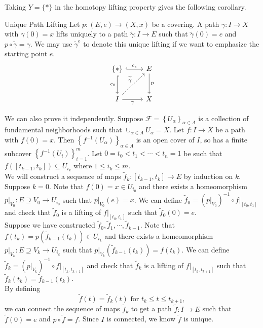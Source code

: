 \documentclass{report}
\begin{document}
Taking $Y=\{*\}$ in the homotopy lifting property gives the following corollary.

\begin{corollary}{Unique Path Lifting}{}
	Let $p: (E,e) \to (X,x)$ be a covering. A path $\gamma: I \to X$ with $\gamma(0)=x$ lifts uniquely to a path $\widetilde{\gamma}: I \to E$ such that $\widetilde{\gamma}(0)=e$ and $p \circ \widetilde{\gamma}=\gamma$. We may use $\widetilde{\gamma}^e$ to denote this unique lifting if we want to emphasize the starting point $e$.
	\[
		\begin{tikzcd}[ampersand replacement=\&]
			\{*\} \arrow[r, "c_e", hook] \arrow[d, "c_0"', hook]                      \& E \arrow[d, "p"] \\ [+8pt]
			I \arrow[r, "\gamma"'] \arrow[ru, "\widetilde{\gamma}", dashed] \& X
		\end{tikzcd}
	\]
\end{corollary}

\begin{prf}
	We can also prove it independently. Suppose $\mathcal{F}=\left\{U_\alpha\right\}_{\alpha\in A}$ is a collection of fundamental neighborhoods such that $\cup_{\alpha\in A}U_\alpha=X$. Let $f:I\to X$ be a path with $f(0)=x$. Then $\left\{f^{-1}(U_\alpha)\right\}_{\alpha\in A}$ is an open cover of $I$, so has a finite subcover $\left\{f^{-1}(U_{i})\right\}_{i=1}^m$. Let $0=t_0<t_1<\cdots<t_n=1$ be such that $f([t_{k-1},t_k])\subseteq U_{i_k}$ where $1\le i_k \le m$. \\
	We will construct a sequence of maps $\widetilde{f}_k:[t_{k-1},t_k]\to E$ by induction on $k$. Suppose $k=0$. Note that $f(0)=x\in U_{i_0}$ and there exists a homeomorphism $\left.p\right|_{V_0}: E\supseteq V_0\to U_{i_0}$ such that $\left.p\right|_{V_0}(e)=x$. We can define $\widetilde{f}_0=\left(\left.p\right|_{V_0}\right)^{-1}\circ f|_{[t_0,t_1]}$ and check that $\widetilde{f}_0$ is a lifting of $f|_{[t_0,t_1]}$ such that $\widetilde{f}_0(0)=e$. \\
	Suppose we have constructed $\widetilde{f}_0,\widetilde{f}_1,\cdots,\widetilde{f}_{k-1}$. Note that $f(t_{k})=p\left(\widetilde{f}_{k-1}(t_k)\right)\in U_{i_k}$ and there exists a homeomorphism $\left.p\right|_{V_k}: E\supseteq V_k\to U_{i_k}$ such that $\left.p\right|_{V_{k}}\left(\widetilde{f}_{k-1}(t_k)\right)=f(t_k)$. We can define $\widetilde{f}_k=\left(\left.p\right|_{V_k}\right)^{-1}\circ f|_{[t_k,t_{k+1}]}$ and check that $\widetilde{f}_k$ is a lifting of $f|_{[t_k,t_{k+1}]}$ such that $\widetilde{f}_k(t_{k})=\widetilde{f}_{k-1}(t_{k})$. \\
	By defining
	\[
		\widetilde{f}(t)=\widetilde{f}_k(t)\text{ for }t_{k}\le t\le t_{k+1},
	\]
	we can connect the sequence of maps $\widetilde{f}_k$ to get a path $\widetilde{f}:I\to E$ such that $\widetilde{f}(0)=e$ and $p\circ \widetilde{f}=f$. Since $I$ is connected, we know $\widetilde{f}$ is unique.
\end{prf}
\end{document}
